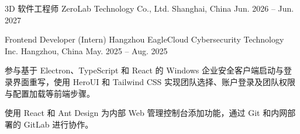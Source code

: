 
\begin{cventries}
  \cventry
  {3D 软件工程师} %
  {ZeroLab Technology Co., Ltd.} %
  {Shanghai, China} %
  {Jun. 2026 -- Jun. 2027} %
  {
    \begin{cvitems} %
      \item
            {
            }
      \item
            {
            }
      \item
            {
            }
    \end{cvitems}
  }

  \cventry
  {Frontend Developer (Intern)} %
  {Hangzhou EagleCloud Cybersecurity Technology Inc.} %
  {Hangzhou, China} %
  {May. 2025 -- Aug. 2025} %
  {
    \begin{cvitems} %
      \item
            {
                  参与基于 Electron、TypeScript 和 React 的 Windows 企业安全客户端启动与登录界面重写，使用 HeroUI 和 Tailwind CSS 实现团队选择、账户登录及团队权限与配置加载等前端步骤。
            }
      \item
            {
                  使用 React 和 Ant Design 为内部 Web 管理控制台添加功能，通过 Git 和内网部署的 GitLab 进行协作。
            }
    \end{cvitems}
  }
\end{cventries}
